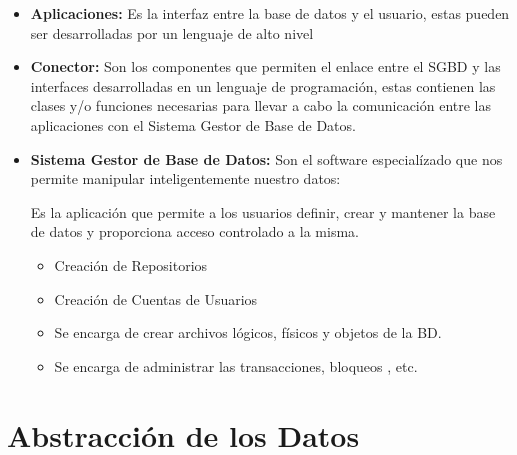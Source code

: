\documentclass[12pt, fleqn]{report}                             %
\begin{document}
            \begin{itemize}
                \item
                    \textbf{Aplicaciones:} Es la interfaz entre la base de datos y el usuario, estas pueden
                    ser desarrolladas por un lenguaje de alto nivel 

                \item
                    \textbf{Conector:} Son los componentes que permiten el enlace entre el SGBD y las
                    interfaces desarrolladas en un lenguaje de programación, estas contienen las clases
                    y/o funciones necesarias para llevar a cabo la comunicación entre las aplicaciones
                    con el Sistema Gestor de Base de Datos.

                \item
                    \textbf{Sistema Gestor de Base de Datos:} Son el software especialízado que
                    nos permite manipular inteligentemente nuestro datos:

                    Es la aplicación que permite a los usuarios definir, crear y mantener la base
                    de datos y proporciona acceso controlado a la misma.

                    \begin{itemize}
                        \item Creación de Repositorios
                        \item Creación de Cuentas de Usuarios
                        \item Se encarga de crear archivos lógicos, físicos y objetos de la BD.
                        \item Se encarga de administrar las transacciones, bloqueos , etc.
                    \end{itemize}

            \end{itemize}




        \clearpage
        \section{Abstracción de los Datos}
\end{document}
